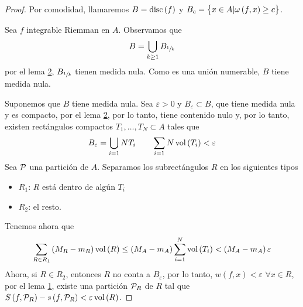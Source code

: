 \begin{proof}
    Por comodidad, llamaremos $B = \operatorname{disc}\left( f \right)$ y $B_c = \left\{x \in A
    \vert \omega\left( f, x \right) \geq c\right\}$.

    \bimplies

    Sea $f$ integrable Riemman en $A$. Observamos que
    \[
        B = \bigcup_{k \geq 1} B_{\sfrac{1}{k}}
    \]
    por el lema \hyperref[lema:dos_lebesgue]{2}, $B_{\sfrac{1}{k}}$ tienen medida
    nula. Como es una unión numerable, $B$ tiene medida nula.

    \bimpliedby

    Suponemos que $B$ tiene medida nula. Sea $\varepsilon > 0$ y $B_\varepsilon
    \subset B$, que tiene medida nula y es compacto, por el lema
    \hyperref[lema:dos_lebesgue]{2}, por lo tanto, tiene contenido nulo y, por lo
    tanto, existen rectángulos compactos $T_1, \dots, T_N \subset A$ tales que
    \[
        B_\varepsilon = \bigcup_{i = 1}{N} T_i \qquad
        \sum_{i=1}{N}\operatorname{vol}\left( T_i \right) < \varepsilon
    \]
    Sea $\mathcal{P}$ una partición de $A$. Separamos los subrectángulos $R$ en los
    siguientes tipos
    \begin{itemize}
        \item $R_1$: $R$ está dentro de algún $T_i$
        \item $R_2$: el resto.
    \end{itemize}

    Tenemos ahora que
    \[
        \sum_{R \in R_1}\left( M_R - m_R \right)\operatorname{vol}\left( R \right) \leq
        \left( M_A -m_A \right)\sum^{N}_{i=1} \operatorname{vol}\left( T_i \right) <
        \left( M_A - m_A \right) \varepsilon
    \]
    Ahora, si $R \in R_2$, entonces $R$ no conta a $B_\varepsilon$, por lo tanto,
    $w(f,x) < \varepsilon$ $\forall x \in R$, por el lema
    \hyperref[lema:uno_lebesgue]{1}, existe una partición $\mathcal{P}_R$ de $R$ tal que
    $S\left( f, \mathcal{P}_R \right) - s\left( f, \mathcal{P}_R \right) < \varepsilon
    \operatorname{vol} \left( R \right)$.


\end{proof}
